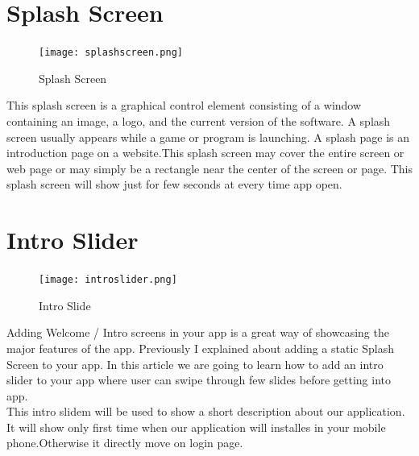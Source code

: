 \documentclass[twoside,a4paper,16pt]{book}
\begin{document}
\begin{itemize}
\begin{enumerate}
\begin{enumerate}
\section{Splash Screen}

\vspace{0.6cm}

\begin{figure}[ht!]
\begin{center}
\texttt{[image: splashscreen.png]}
\caption{Splash Screen}
\end{center}
\end{figure}

 \vspace{0.2cm}

This  splash screen is a graphical control element consisting of a window containing an image, a logo, and the current version of the software. A splash screen usually appears while a game or program is launching.
A splash page is an introduction page on a website.This splash screen may cover the entire screen or web page or may simply be a rectangle near the center of the screen or page. This splash screen will show just for few seconds at every time app open.


\section{Intro Slider}

\vspace{0.6cm}

\begin{figure}[ht!]
\begin{center}
\texttt{[image: introslider.png]}
\caption{Intro Slide}
\end{center}
\end{figure}

 \vspace{0.2cm}

Adding Welcome / Intro screens in your app is a great way of showcasing the major features of the app. Previously I explained about adding a static Splash Screen to your app. In this article we are going to learn how to add an intro slider to your app where user can swipe through few slides before getting into app.\\

This intro slidem will be  used to show a short description about our application.\\
It will show only first time when our application will installes in your mobile phone.Otherwise it directly move on login page.






\end{enumerate}
\end{enumerate}
\end{itemize}
\end{document}

